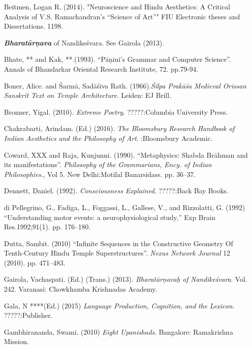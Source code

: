 \begin{thebibliography}{99}
\itemsep=2pt
Beitmen, Logan R. (2014). "Neuroscience and Hindu Aesthetics: A Critical Analysis of V.S. Ramachandran’s “Science of Art”" FIU Electronic theses and Dissertations. 1198.

{\sl\bfseries Bharatārṇava} of Nandikeśvara. See Gairola (2013).

Bhate, ** and Kak, **.(1993). “Pāṇini’s Grammar and Computer Science”. Annals of Bhandarkar Oriental Research Institute, 72. pp.79-94.

Boner, Alice. and Śarmā, Sadāśiva Rath. (1966).\textsl{Śilpa Prakāśa Medieval Orissan Sanskrit Text on Temple Architecture}. Leiden: EJ Brill.

Bronner, Yigal. (2010). \textsl{Extreme Poetry}. ?????:Columbia University Press.

Chakrabarti, Arindam. (Ed.) (2016). \textsl{The Bloomsbury Research Handbook of Indian Aesthetics and the Philosophy of Art}. :Bloomsbury Academic.

Coward, XXX and Raja, Kunjunni. (1990). “Metaphysics: Shabda Brāhman and its manifestations”. \textsl{Philosophy of the Grammarians, Ency. of Indian Philosophies}., Vol 5. New Delhi:Motilal Banarsidass. pp. 36--37.

Dennett, Daniel. (1992). \textsl{Consciousness Explained}. ?????:Back Bay Books.

di Pellegrino, G., Fadiga, L., Foggassi, L., Gallese, V., and Rizzolatti, G. (1992) “Understanding motor events: a neurophysiological study,” Exp Brain Res.1992;91(1). pp. 176--180.

Dutta, Sambit. (2010) “Infinite Sequences in the Constructive Geometry Of Tenth-Century Hindu Temple  Superstructures”. \textsl{Nexus Network Journal} 12 (2010). pp. 471--483.

Gairola, Vachaspati. (Ed.) (Trans.) (2013). \textsl{Bharatārṇavaḥ of Nandikeśvara}. Vol. 242. Varanasi: Chowkhamba Krishnadas Academy.

Gala, N ****(Ed.) (2015) \textsl{Language Production, Cognition, and the Lexicon}. ?????:Publisher.

Gambhirananda, Swami. (2010) \textsl{Eight Upanishads}. Bangalore: Ramakrishna Mission.


\end{thebibliography}
